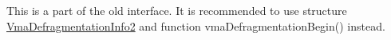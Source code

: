 
\begin{DoxyRefList}
\item[Class \mbox{\hyperlink{structVmaDefragmentationInfo}{Vma\+Defragmentation\+Info}} ]\label{deprecated__deprecated000002}%
%
This is a part of the old interface. It is recommended to use structure \mbox{\hyperlink{structVmaDefragmentationInfo2}{Vma\+Defragmentation\+Info2}} and function vma\+Defragmentation\+Begin() instead. 
\end{DoxyRefList}